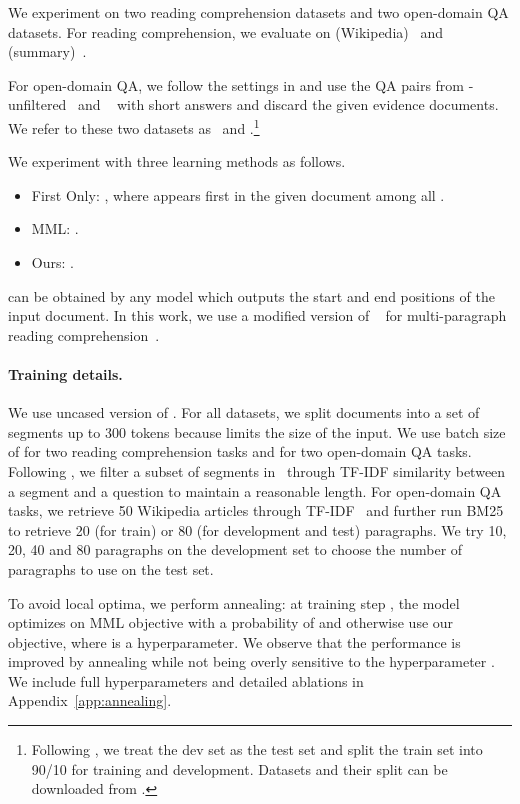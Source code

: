 \documentclass[11pt,a4paper]{article}
\begin{document}
We experiment on two reading comprehension datasets and two open-domain QA datasets. For reading comprehension, we evaluate on \trivia{} (Wikipedia)~\citep{triviaqa} and \narrative{} (summary)~\citep{narrativeqa}. 


For open-domain QA, we follow the settings in \citet{lee2019latent} and use the QA pairs from \trivia-unfiltered~\citep{triviaqa} and \nq~\citep{naturalquestions} with short answers and discard the given evidence documents. We refer to these two datasets as \triviaopen\ and \nqopen.\footnote{
Following \citet{lee2019latent}, we treat the dev set as the test set and split the train set into 90/10 for training and development.
Datasets and their split can be downloaded from \dataurl.}


We experiment with three learning methods as follows.
\vspace{-2pt}
\begin{itemize}\itemsep -.7pt
    \item First Only: , where  appears first in the given document among all .
    \item MML: .
    \item Ours: .
\end{itemize}

 can be obtained by any model which outputs the start and end positions of the input document. In this work, we use a modified version of \bert{}~\citep{bert} for multi-paragraph reading comprehension~\citep{min2019compositional}.


\paragraph{Training details.} We use uncased version of \bert{}.
For all datasets, we split  documents into a set of segments up to 300 tokens because \bert{} limits the size of the input.
We use batch size of  for two reading comprehension tasks and  for two open-domain QA tasks.
Following \citet{clark2018multi}, we filter a subset of segments in \trivia\ through TF-IDF similarity between a segment and a question to maintain a reasonable length. 
For open-domain QA tasks, we retrieve 50 Wikipedia articles through TF-IDF~\citep{squad-open} and further run BM25~\citep{robertson2009probabilistic} to retrieve 20 (for train) or 80 (for development and test) paragraphs. We try 10, 20, 40 and 80 paragraphs on the development set to choose the number of paragraphs to use on the test set.

To avoid local optima, we perform annealing: at training step , the model optimizes on MML objective with a probability of  and otherwise use our objective, where  is a hyperparameter. We observe that the performance is improved by annealing while not being overly sensitive to the hyperparameter . We include full hyperparameters and detailed ablations in Appendix~\ref{app:annealing}.
\end{document}
